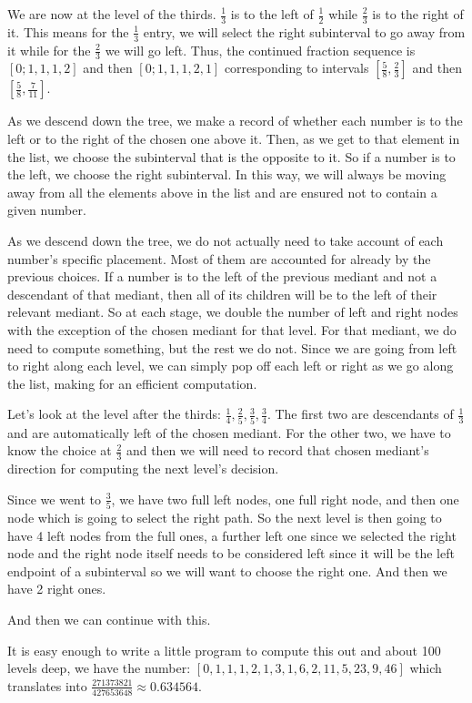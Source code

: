 \documentclass[12pt]{article}
\theoremstyle{remark}
\begin{document}
We are now at the level of the thirds. $\frac{1}{3}$ is to the left of $\frac{1}{2}$ while $\frac{2}{3}$ is to the right of it. This means for the $\frac{1}{3}$ entry, we will select the right subinterval to go away from it while for the $\frac{2}{3}$ we will go left. Thus, the continued fraction sequence is $[0;1, 1, 1, 2]$ and then $[0; 1, 1, 1, 2, 1]$ corresponding to intervals $[\frac{5}{8}, \frac{2}{3}]$ and then $[\frac{5}{8}, \frac{7}{11}]$. 

As we descend down the tree, we make a record of whether each number is to the left or to the right of the chosen one above it. Then, as we get to that element in the list, we choose the subinterval that is the opposite to it. So if a number is to the left, we choose the right subinterval. In this way, we will always be moving away from all the elements above in the list and are ensured not to contain a given number. 

As we descend down the tree, we do not actually need to take account of each number's specific placement. Most of them are accounted for already by the previous choices. If a number is to the left of the previous mediant and not a descendant of that mediant, then all of its children will be to the left of their relevant mediant. So at each stage, we double the number of left and right nodes with the exception of the chosen mediant for that level. For that mediant, we do need to compute something, but the rest we do not. Since we are going from left to right along each level, we can simply pop off each left or right as we go along the list, making for an efficient computation. 

Let's look at the level after the thirds:  $\frac{1}{4}, \frac{2}{5}, \frac{3}{5}, \frac{3}{4}$. The first two are descendants of $\frac{1}{3}$ and are automatically left of the chosen mediant. For the other two, we have to know the choice at $\frac{2}{3}$ and then we will need to record that chosen mediant's direction for computing the next level's decision. 

Since we went to $\frac{3}{5}$, we have two full left nodes, one full right node, and then one node which is going to select the right path. So the next level is then going to have 4 left nodes from the full ones, a further left one since we selected the right node and the right node itself needs to be considered left since it will be the left endpoint of a subinterval so we will want to choose the right one. And then we have 2 right ones. 

And then we can continue with this. 

It is easy enough to write a little program to compute this out and about 100 levels deep, we have the number:  $[
       0,      1,      1,      1,       2,
       1,      3,      1,      6,       2,
      11,      5,     23,      9,      46]$  which translates into $\frac{271373821}{427653648} \approx 0.634564$. 


\medskip

\printbibliography
\end{document}
